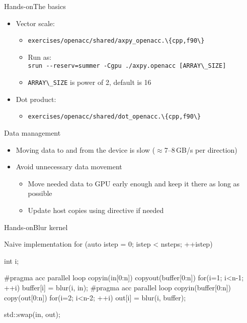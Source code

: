 \documentclass[12pt,aspectratio=169]{beamer}
\newcommand\shinline[2][]{\lstinline[style=shstyle,basicstyle=\ttfamily,#1]!#2!}
\begin{document}
\begin{frame}{Hands-on}{The basics}
  \begin{itemize}
  \item Vector scale:
    \begin{itemize}
    \item \shinline{exercises/openacc/shared/axpy_openacc.\{cpp,f90\}}
    \item Run as: \\
      \shinline{srun --reserv=summer -Cgpu ./axpy.openacc [ARRAY\_SIZE]}
    \item \shinline{ARRAY\_SIZE} is power of 2, default is 16
    \end{itemize}
    \vfill
  \item Dot product:
    \begin{itemize}
    \item \shinline{exercises/openacc/shared/dot_openacc.\{cpp,f90\}}
    \end{itemize}
  \end{itemize}
\end{frame}

\begin{frame}{Data management}
  \begin{itemize}
  \item Moving data to and from the device is slow ($\approx$7--8\,GB/s per direction)
  \item Avoid unnecessary data movement
    \begin{itemize}
    \item Move needed data to GPU early enough and keep it there as long as possible
    \item Update host copies using  directive if needed
    \end{itemize}
  \end{itemize}
\end{frame}

\begin{frame}[fragile]{Hands-on}{Blur kernel}
  \begin{Cpplisting}{Naive implementation}
for (auto istep = 0; istep < nsteps; ++istep) {
    int i;

    #pragma acc parallel loop copyin(in[0:n]) copyout(buffer[0:n])
    for(i=1; i<n-1; ++i) {
        buffer[i] = blur(i, in);
    }
    #pragma acc parallel loop copyin(buffer[0:n]) copy(out[0:n])
    for(i=2; i<n-2; ++i) {
        out[i] = blur(i, buffer);
    }

    std::swap(in, out);
}
  \end{Cpplisting}
\end{frame}
\end{document}
